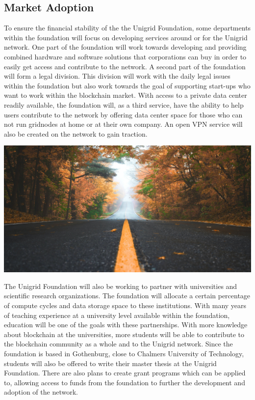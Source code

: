 \documentclass[a4paper,oneside]{article}
\begin{document}
\subsection{Market Adoption}
To ensure the financial stability of the the Unigrid Foundation, some departments within the foundation will focus on developing services around or for the Unigrid network. One part of the foundation will work towards developing and providing combined hardware and software solutions that corporations can buy in order to easily get access and contribute to the network. A second part of the foundation will form a legal division. This division will work with the daily legal issues within the foundation but also work towards the goal of supporting start-ups who want to work within the blockchain market. With access to a private data center readily available, the foundation will, as a third service, have the ability to help users contribute to the network by offering data center space for those who can not run gridnodes at home or at their own company. An open VPN service will also be created on the network to gain traction. 

\vspace{0.12cm}
\begin{mdframed}[style=textimage]
	\includegraphics[width=381pt]{road}
\end{mdframed}

\noindent The Unigrid Foundation will also be working to partner with universities and scientific research organizations. The foundation will allocate a certain percentage of compute cycles and data storage space to these institutions. With many years of teaching experience at a university level available within the foundation, education will be one of the goals with these partnerships. With more knowledge about blockchain at the universities, more students will be able to contribute to the blockchain community as a whole and to the Unigrid network. Since the foundation is based in Gothenburg, close to Chalmers University of Technology, students will also be offered to write their master thesis at the Unigrid Foundation. There are also plans to create grant programs which can be applied to, allowing access to funds from the foundation to further the development and adoption of the network. 
\end{document}
